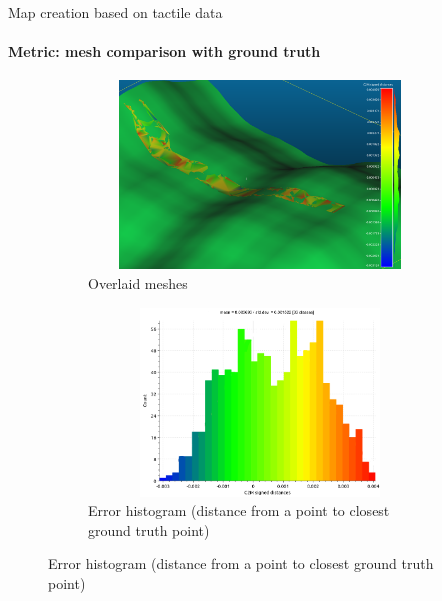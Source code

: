 \documentclass[aspectratio=169]{beamer}
\begin{document}
\begin{frame}[t]{Map creation based on tactile data}
    \framesubtitle{Metric: mesh comparison with ground truth}
    \vspace{-15pt}
    \begin{figure}[H]
        \begin{subfigure}[t]{0.49\textwidth}
            \centering\includegraphics[height=5cm,width=1\textwidth,keepaspectratio]{mesh_comp.png}
            \caption*{Overlaid meshes}
        \end{subfigure}
        \begin{subfigure}[t]{0.49\textwidth}
            \centering\includegraphics[height=5cm,width=1\textwidth,keepaspectratio]{mesh_hist.png}
            \caption*{Error histogram (distance from a point to closest ground truth point)}
        \end{subfigure}
    \end{figure}
\end{frame}
\end{document}
